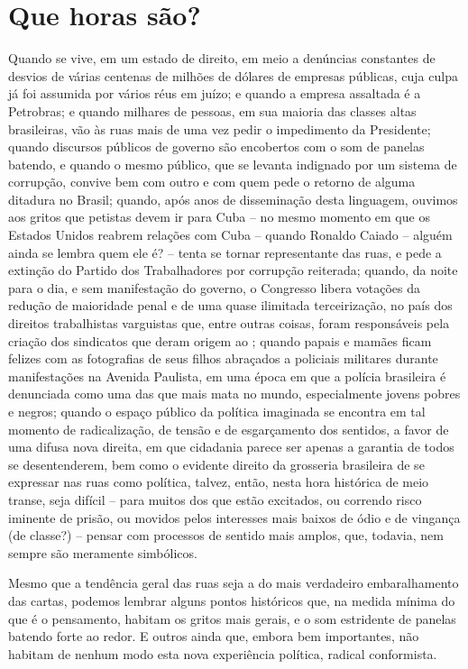   \section{Que horas são?}\label{que-horas-suxe3o}

Quando se vive, em um estado de direito, em meio a denúncias constantes
de desvios de várias centenas de milhões de dólares de empresas
públicas, cuja culpa já foi assumida por vários réus em juízo; e quando
a empresa assaltada é a Petrobras; e quando milhares de pessoas, em sua
maioria das classes altas brasileiras, vão às ruas mais de uma vez pedir
o impedimento da Presidente; quando discursos públicos de governo são
encobertos com o som de panelas batendo, e quando o mesmo público, que
se levanta indignado por um sistema de corrupção, convive bem com outro
e com quem pede o retorno de alguma ditadura no Brasil; quando, após
anos de disseminação desta linguagem, ouvimos aos gritos que petistas
devem ir para Cuba -- no mesmo momento em que os Estados Unidos reabrem
relações com Cuba -- quando Ronaldo Caiado -- alguém ainda se lembra
quem ele é? -- tenta se tornar representante das ruas, e pede a extinção
do Partido dos Trabalhadores por corrupção reiterada; quando, da noite
para o dia, e sem manifestação do governo, o Congresso libera votações
da redução de maioridade penal e de uma quase ilimitada terceirização,
no país dos direitos trabalhistas varguistas que, entre outras coisas,
foram responsáveis pela criação dos sindicatos que deram origem ao ;
quando papais e mamães ficam felizes com as fotografias de seus filhos
abraçados a policiais militares durante manifestações na Avenida
Paulista, em uma época em que a polícia brasileira é denunciada como uma
das que mais mata no mundo, especialmente jovens pobres e negros; quando
o espaço público da política imaginada se encontra em tal momento de
radicalização, de tensão e de esgarçamento dos sentidos, a favor de uma
difusa nova direita, em que cidadania parece ser apenas a garantia de
todos se desentenderem, bem como o evidente direito da grosseria
brasileira de se expressar nas ruas como política, talvez, então, nesta
hora histórica de meio transe, seja difícil -- para muitos dos que estão
excitados, ou correndo risco iminente de prisão, ou movidos pelos
interesses mais baixos de ódio e de vingança (de classe?) -- pensar com
processos de sentido mais amplos, que, todavia, nem sempre são meramente
simbólicos.

Mesmo que a tendência geral das ruas seja a do mais verdadeiro
embaralhamento das cartas, podemos lembrar alguns pontos históricos que,
na medida mínima do que é o pensamento, habitam os gritos mais gerais, e
o som estridente de panelas batendo forte ao redor. E outros ainda que,
embora bem importantes, não habitam de nenhum modo esta nova experiência
política, radical conformista.

